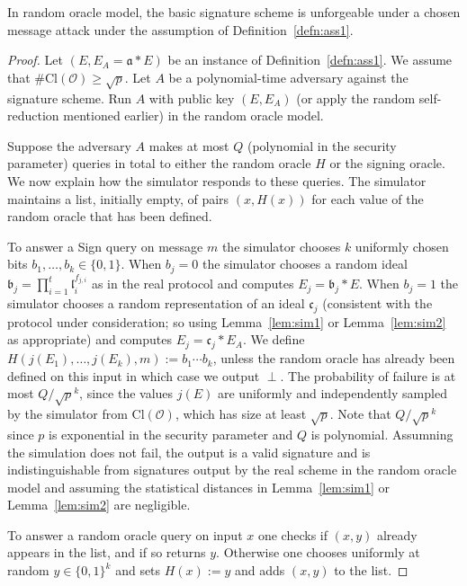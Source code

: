 \documentclass{llncs}
\newcommand{\OO}{\mathcal{O}}
\newcommand{\Cl}{\text{Cl}}
\renewcommand{\a}{\mathfrak{a}}
\renewcommand{\b}{\mathfrak{b}}
\renewcommand{\c}{\mathfrak{c}}
\renewcommand{\l}{\mathfrak{l}}
\begin{document}
\begin{theorem}\label{thm:security}
In random oracle model, the basic signature scheme is unforgeable under a chosen message attack under the assumption of Definition~\ref{defn:ass1}.
\end{theorem}

\begin{proof}
Let $(E, E_A = \a * E )$ be an instance of Definition~\ref{defn:ass1}.
We assume that $\#\Cl(\OO) \ge \sqrt{p}$.
Let $A$ be a polynomial-time adversary against the signature scheme.
Run $A$ with public key $(E, E_A)$ (or apply the random self-reduction mentioned earlier) in the random oracle model.

Suppose the adversary $A$ makes at most $Q$ (polynomial in the security parameter) queries in total to either the random oracle $H$ or the signing oracle. We now explain how the simulator responds to these queries. The simulator maintains a list, initially empty, of pairs $(x, H(x))$ for each value of the random oracle that has been defined.

To answer a Sign query on message $m$ the simulator chooses 
$k$ uniformly chosen bits $b_1, \dots, b_k \in \{0,1\}$.
When $b_j = 0$ the simulator chooses a random ideal $\b_j = \prod_{i=1}^t \l_i^{f_{j,i}}$ as in the real protocol and computes $E_j = \b_j * E$.
When $b_j = 1$ the simulator chooses a random representation of an ideal $\c_j$ (consistent with the protocol under consideration; so using Lemma~\ref{lem:sim1} or Lemma~\ref{lem:sim2} as appropriate) and computes $E_j = \c_j * E_A$.
We define $H( j( E_1), \dots, j(E_k), m ) := b_1 \cdots b_k$, unless the random oracle has already been defined on this input in which case we output $\perp$.
The probability of failure is at most $Q/\sqrt{p}^k$, since the values $j(E)$ are uniformly and independently sampled by the simulator from $\Cl(\OO)$, which has size at least $\sqrt{p}$.
Note that $Q/\sqrt{p}^k$ since $p$ is exponential in the security parameter and $Q$ is polynomial.
Assumning the simulation does not fail, the output is a valid signature and is indistinguishable from signatures output by the real scheme in the random oracle model and assuming the statistical distances in Lemma~\ref{lem:sim1} or Lemma~\ref{lem:sim2} are negligible.

To answer a random oracle query on input $x$ one checks if $(x,y)$ already appears in the list, and if so returns $y$. Otherwise one chooses uniformly at random $y \in \{0,1\}^k$ and sets $H(x) := y$ and adds $(x,y)$ to the list.


\end{proof}
\end{document}
